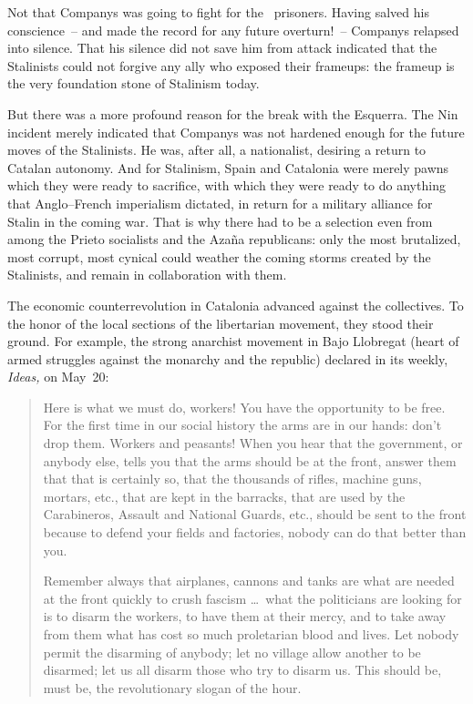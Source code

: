 Not that Companys was going to fight for the \POUM\ prisoners. Having salved his conscience~-- and made the record for any future overturn!~-- Companys relapsed into silence. That his silence did not save him from attack indicated that the Stalinists could not forgive any ally who exposed their frameups: the frameup is the very foundation stone of Stalinism today.

But there was a more profound reason for the break with the Esquerra. The Nin incident merely indicated that Companys was not hardened enough for the future moves of the Stalinists. He was, after all, a nationalist, desiring a return to Catalan autonomy. And for Stalinism, Spain and Catalonia were merely pawns which they were ready to sacrifice, with which they were ready to do anything that Anglo--French imperialism dictated, in return for a military alliance for Stalin in the coming war. That is why there had to be a selection even from among the Prieto socialists and the Azaña republicans: only the most brutalized, most corrupt, most cynical could weather the coming storms created by the Stalinists, and remain in collaboration with them.

The economic counterrevolution in Catalonia advanced against the collectives. To the honor of the local sections of the libertarian movement, they stood their ground. For example, the strong anarchist  movement in Bajo Llobregat (heart of armed struggles against the monarchy and the republic) declared in its weekly\kn, \emph{Ideas,} on May~20:

\begin{quotation}
  Here is what we must do, workers! You have the opportunity to be free. For the first time in our social history the arms are in our hands: don’t drop them. Workers and peasants! When you hear that the government, or anybody else, tells you that the arms should be at the front, answer them that that is certainly so, that the thousands of rifles, machine guns, mortars, etc., that are kept in the barracks, that are used by the Carabineros, Assault and National Guards, etc., should be sent to the front because to defend your fields and factories, nobody can do that better than you.
  
  Remember always that airplanes, cannons and tanks are what are needed at the front quickly to crush fascism \dots\ what the politicians are looking for is to disarm the workers, to have them at their mercy, and to take away from them what has cost so much proletarian blood and lives. Let nobody permit the disarming of anybody; let no village allow another to be disarmed; let us all disarm those who try to disarm us. This should be, must be, the revolutionary slogan of the hour.
\end{quotation}

